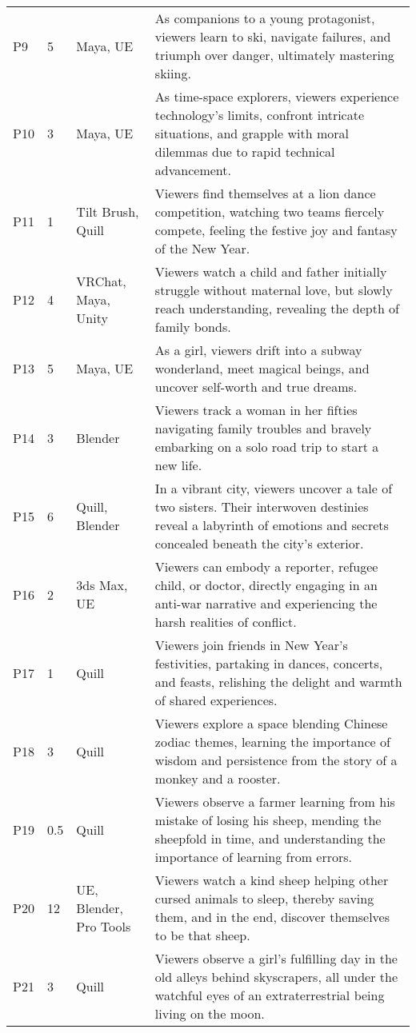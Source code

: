 \begin{table*}[ht]
\begin{tabular}{m{0.9cm}m{0.7cm}m{3cm}m{11cm}}
\cline{1-4}
P9 & 5 & Maya, UE & As companions to a young protagonist, viewers learn to ski, navigate failures, and triumph over danger, ultimately mastering skiing. \\
\cline{1-4}
P10 & 3 & Maya, UE & As time-space explorers, viewers experience technology's limits, confront intricate situations, and grapple with moral dilemmas due to rapid technical advancement. \\
\cline{1-4}
P11 & 1 & Tilt Brush, Quill & Viewers find themselves at a lion dance competition, watching two teams fiercely compete, feeling the festive joy and fantasy of the New Year. \\
\cline{1-4}
P12 & 4 & VRChat, Maya, Unity & Viewers watch a child and father initially struggle without maternal love, but slowly reach understanding, revealing the depth of family bonds. \\
\cline{1-4}
P13 & 5 & Maya, UE & As a girl, viewers drift into a subway wonderland, meet magical beings, and uncover self-worth and true dreams. \\
\cline{1-4}
P14 & 3 & Blender & Viewers track a woman in her fifties navigating family troubles and bravely embarking on a solo road trip to start a new life. \\
\cline{1-4}
P15 & 6 & Quill, Blender & In a vibrant city, viewers uncover a tale of two sisters. Their interwoven destinies reveal a labyrinth of emotions and secrets concealed beneath the city's exterior. \\
\cline{1-4}
P16 & 2 & 3ds Max, UE & Viewers can embody a reporter, refugee child, or doctor, directly engaging in an anti-war narrative and experiencing the harsh realities of conflict. \\
\cline{1-4}
P17 & 1 & Quill & Viewers join friends in New Year's festivities, partaking in dances, concerts, and feasts, relishing the delight and warmth of shared experiences. \\
\cline{1-4}
P18 & 3 & Quill & Viewers explore a space blending Chinese zodiac themes, learning the importance of wisdom and persistence from the story of a monkey and a rooster.\\
\cline{1-4}
P19 & 0.5 & Quill & Viewers observe a farmer learning from his mistake of losing his sheep, mending the sheepfold in time, and understanding the importance of learning from errors. \\
\cline{1-4}
P20 & 12 & UE, Blender, Pro Tools & Viewers watch a kind sheep helping other cursed animals to sleep, thereby saving them, and in the end, discover themselves to be that sheep. \\
\cline{1-4}
P21 & 3 & Quill & Viewers observe a girl's fulfilling day in the old alleys behind skyscrapers, all under the watchful eyes of an extraterrestrial being living on the moon. \\ 
\bottomrule
\end{tabular}
\end{table*}
